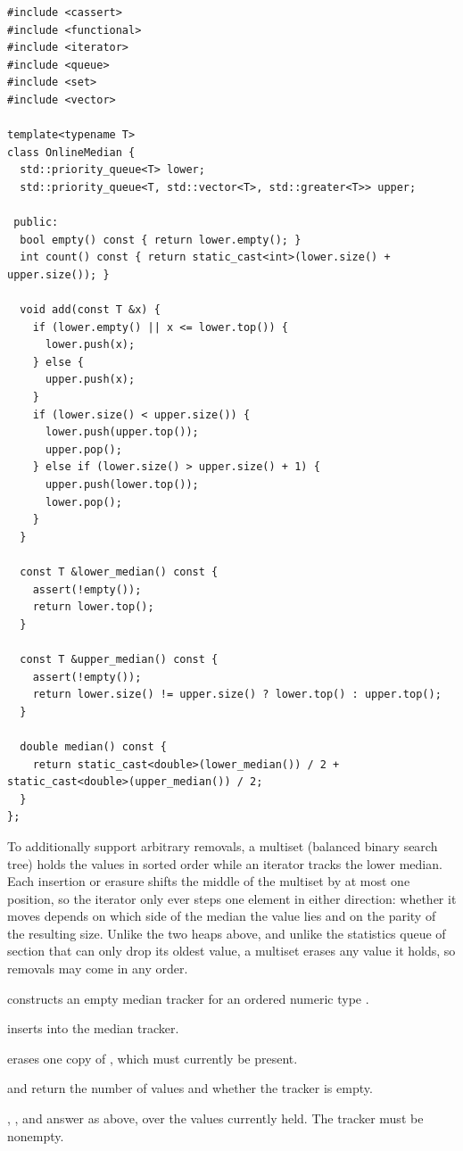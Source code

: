 \begin{lstlisting}[style=cpp]
#include <cassert>
#include <functional>
#include <iterator>
#include <queue>
#include <set>
#include <vector>

template<typename T>
class OnlineMedian {
  std::priority_queue<T> lower;
  std::priority_queue<T, std::vector<T>, std::greater<T>> upper;

 public:
  bool empty() const { return lower.empty(); }
  int count() const { return static_cast<int>(lower.size() + upper.size()); }

  void add(const T &x) {
    if (lower.empty() || x <= lower.top()) {
      lower.push(x);
    } else {
      upper.push(x);
    }
    if (lower.size() < upper.size()) {
      lower.push(upper.top());
      upper.pop();
    } else if (lower.size() > upper.size() + 1) {
      upper.push(lower.top());
      lower.pop();
    }
  }

  const T &lower_median() const {
    assert(!empty());
    return lower.top();
  }

  const T &upper_median() const {
    assert(!empty());
    return lower.size() != upper.size() ? lower.top() : upper.top();
  }

  double median() const {
    return static_cast<double>(lower_median()) / 2 + static_cast<double>(upper_median()) / 2;
  }
};
\end{lstlisting}
To additionally support arbitrary removals, a multiset (balanced binary search tree) holds the values in sorted order while an iterator tracks the lower median. Each insertion or erasure shifts the middle of the multiset by at most one position, so the iterator only ever steps one element in either direction: whether it moves depends on which side of the median the value lies and on the parity of the resulting size. Unlike the two heaps above, and unlike the statistics queue of section  that can only drop its oldest value, a multiset erases any value it holds, so removals may come in any order.

\begin{compactitem}
  \item {} constructs an empty median tracker for an ordered numeric type .
  \item {} inserts  into the median tracker.
  \item {} erases one copy of , which must currently be present.
  \item {} and  return the number of values and whether the tracker is empty.
  \item {}, , and  answer as above, over the values currently held. The tracker must be nonempty.
\end{compactitem}

